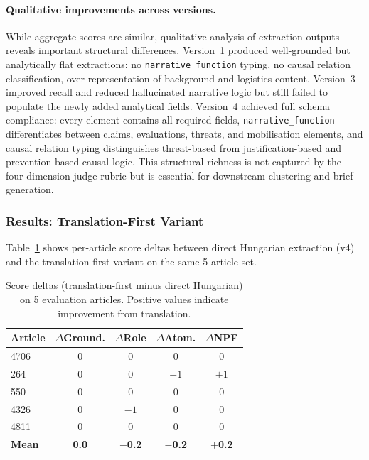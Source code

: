 \documentclass[10pt, a4paper]{article}
\begin{document}
\paragraph{Qualitative improvements across versions.}
While aggregate scores are similar, qualitative analysis of extraction outputs reveals important structural differences. Version~1 produced well-grounded but analytically flat extractions: no \texttt{narrative\_function} typing, no causal relation classification, over-representation of background and logistics content. Version~3 improved recall and reduced hallucinated narrative logic but still failed to populate the newly added analytical fields. Version~4 achieved full schema compliance: every element contains all required fields, \texttt{narrative\_function} differentiates between claims, evaluations, threats, and mobilisation elements, and causal relation typing distinguishes threat-based from justification-based and prevention-based causal logic. This structural richness is not captured by the four-dimension judge rubric but is essential for downstream clustering and brief generation.


\subsubsection{Results: Translation-First Variant}
\label{sec:results_translation}

Table~\ref{tab:translation_delta} shows per-article score deltas between direct Hungarian extraction (v4) and the translation-first variant on the same 5-article set.

\begin{table}[!ht]
\begin{center}
\begin{tabular}{lcccc}
  \hline
  \textbf{Article} & \textbf{$\Delta$Ground.} & \textbf{$\Delta$Role} & \textbf{$\Delta$Atom.} & \textbf{$\Delta$NPF} \\
  \hline
  4706  & 0 & 0  & 0  & 0  \\
  264   & 0 & 0  & $-1$ & $+1$ \\
  550   & 0 & 0  & 0  & 0  \\
  4326  & 0 & $-1$ & 0  & 0  \\
  4811  & 0 & 0  & 0  & 0  \\
  \hline
  \textbf{Mean} & \textbf{0.0} & \textbf{$-$0.2} & \textbf{$-$0.2} & \textbf{$+$0.2} \\
  \hline
\end{tabular}
\caption{Score deltas (translation-first minus direct Hungarian) on 5 evaluation articles. Positive values indicate improvement from translation.}
\label{tab:translation_delta}
\end{center}
\end{table}
\end{document}
